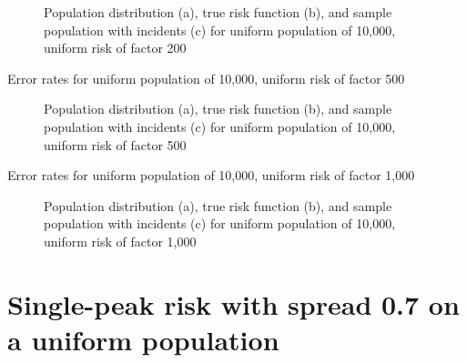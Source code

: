 \begin{figure}[H]
    
    \caption[]{Population distribution (a), true risk function (b), and sample population with incidents (c) for uniform population of 10,000, uniform risk of \gls{factor} 200}
    \label{fig:distributions:unif_200_unif}    
\end{figure}



\begin{table}[H]

\caption[]{Error rates for uniform population of 10,000, uniform risk of \gls{factor} 500}
\label{tab:mean_error_rates:unif_500_unif}
\end{table}

\begin{figure}[H]
    
    \caption[]{Population distribution (a), true risk function (b), and sample population with incidents (c) for uniform population of 10,000, uniform risk of \gls{factor} 500}
    \label{fig:distributions:unif_500_unif}    
\end{figure}



\begin{table}[H]

\caption[]{Error rates for uniform population of 10,000, uniform risk of \gls{factor} 1,000}
\label{tab:mean_error_rates:unif_1000_unif}
\end{table}

\begin{figure}[H]
    
    \caption[]{Population distribution (a), true risk function (b), and sample population with incidents (c) for uniform population of 10,000, uniform risk of \gls{factor} 1,000}
    \label{fig:distributions:unif_1000_unif}    
\end{figure}

\section{Single-peak risk with spread 0.7 on a uniform population}
\label{sec:app:results_unif_0.7_1h}


